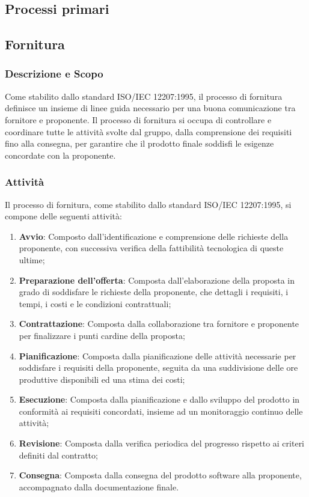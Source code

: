 \documentclass[10pt]{article}
\begin{document}
\begin{justify}
\newpage
\section{Processi primari}
    \subsection{Fornitura}

    \subsubsection{Descrizione e Scopo}
    Come stabilito dallo standard ISO/IEC 12207:1995, il processo di fornitura definisce un insieme di linee guida necessario per una buona comunicazione tra fornitore e proponente. Il processo di fornitura si occupa di controllare e coordinare tutte le attività svolte dal gruppo, dalla comprensione dei requisiti fino alla consegna, per garantire che il prodotto finale soddisfi le esigenze concordate con la proponente.\\

    \subsubsection{Attività}
    Il processo di fornitura, come stabilito dallo standard ISO/IEC 12207:1995, si compone delle seguenti attività:
    \begin{enumerate}
        \item \textbf{Avvio}: Composto dall'identificazione e comprensione delle richieste della proponente, con successiva verifica della fattibilità tecnologica di queste ultime;
        \item \textbf{Preparazione dell'offerta}: Composta dall'elaborazione della proposta in grado di soddisfare le richieste della proponente, che dettagli i requisiti, i tempi, i costi e le condizioni contrattuali;
        \item \textbf{Contrattazione}: Composta dalla collaborazione tra fornitore e proponente per finalizzare i punti cardine della proposta;
        \item \textbf{Pianificazione}: Composta dalla pianificazione delle attività necessarie per soddisfare i requisiti della proponente, seguita da una suddivisione delle ore produttive disponibili ed una stima dei costi;
        \item \textbf{Esecuzione}: Composta dalla pianificazione e dallo sviluppo del prodotto in conformità ai requisiti concordati, insieme ad un monitoraggio continuo delle attività;
        \item \textbf{Revisione}: Composta dalla verifica periodica del progresso rispetto ai criteri definiti dal contratto;
        \item \textbf{Consegna}: Composta dalla consegna del prodotto software alla proponente, accompagnato dalla documentazione finale.
    \end{enumerate}


\end{justify}
\end{document}
